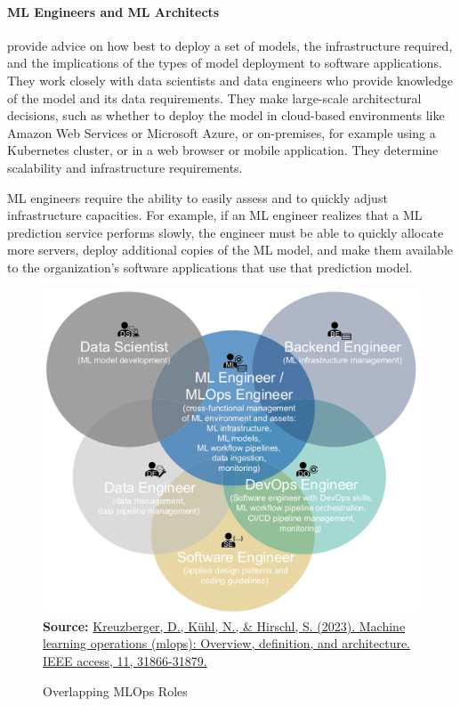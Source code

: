 \paragraph*{ML Engineers and ML Architects} provide advice on how best to deploy a set of models, the infrastructure required, and the implications of the types of model deployment to software applications. They work closely with data scientists and data engineers who provide knowledge of the model and its data requirements. They make large-scale architectural decisions, such as whether to deploy the model in cloud-based environments like Amazon Web Services or Microsoft Azure, or on-premises, for example using a Kubernetes cluster, or in a web browser or mobile application. They determine scalability and infrastructure requirements.

ML engineers require the ability to easily assess and to quickly adjust infrastructure capacities. For example, if an ML engineer realizes that a ML prediction service performs slowly, the engineer must be able to quickly allocate more servers, deploy additional copies of the ML model, and make them available to the organization's software applications that use that prediction model. 

\begin{figure}
\centering
\includegraphics[width=.75\textwidth]{Kreuzbergeretal_fig3.png}  \\

\scriptsize \textbf{Source:} \href{https://ieeexplore.ieee.org/abstract/document/10081336}{Kreuzberger, D., K\"uhl, N., \& Hirschl, S. (2023). Machine learning operations (mlops): Overview, definition, and architecture. IEEE access, 11, 31866-31879.}
\caption{Overlapping MLOps Roles}
\label{fig:mlopsskills}
\end{figure}

